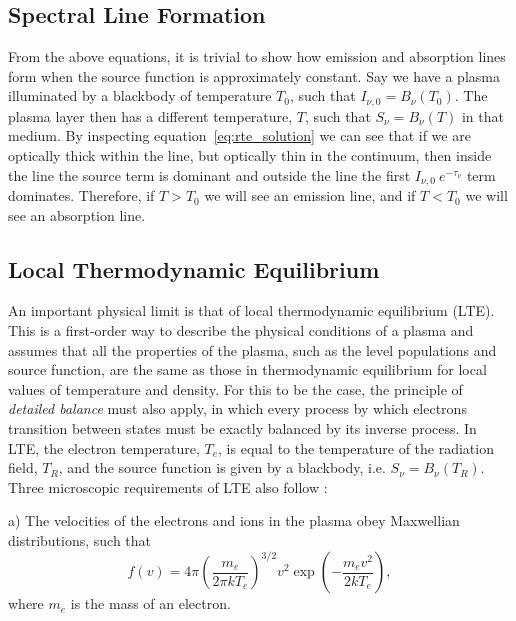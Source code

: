 


\subsection{Spectral Line Formation}

From the above equations, it is trivial to show how emission and absorption lines form when
the source function is approximately constant.
Say we have a plasma illuminated by a blackbody of temperature $T_0$, such that
$I_{\nu,0} = B_\nu (T_0)$. The plasma layer then has a different temperature, $T$,
such that $S_\nu = B_\nu (T)$ in that medium. By inspecting equation~\ref{eq:rte_solution}
we can see that if we are optically thick within the line, but optically
thin in the continuum, then inside the line the source term is dominant and outside 
the line the first $I_{\nu,0}~e^{-\tau_\nu}$ term dominates. Therefore, if $T > T_0$ we will 
see an emission line, and if $T < T_0$ we will see an absorption line. 

\subsection{Local Thermodynamic Equilibrium}
\label{sec:lte}


An important physical limit is that of local thermodynamic equilibrium (LTE).
This is a first-order way to describe the physical conditions of a plasma and assumes
that all the properties of the plasma, such as the level populations and source function,
are the same as those in thermodynamic equilibrium for local values of 
temperature and density. For this to be the case, the principle of 
{\em detailed balance} must also apply, in which every 
process by which electrons transition between states must be exactly 
balanced by its inverse process. In LTE, the electron temperature, 
$T_e$, is equal to the temperature of the radiation field, $T_R$, and
the source function is given by a blackbody, i.e. $S_\nu = B_\nu (T_R)$.
Three microscopic requirements of LTE also follow \citep{mihalas}:

a) The velocities of the electrons and ions in the plasma obey Maxwellian
distributions, such that
\begin{equation}
f(v) = 4 \pi \left( \frac{m_e}{2 \pi kT_e} \right)^{3/2} v^2 
\exp \left( - \frac{m_ev^2}{2kT_e} \right),
\label{eq:maxwellian}
\end{equation}
where $m_e$ is the mass of an electron.

